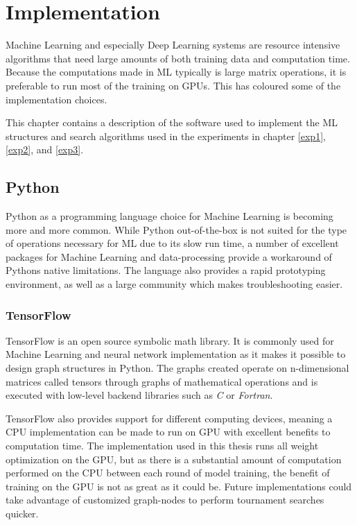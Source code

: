 \chapter{Implementation}
\label{implementation}
Machine Learning and especially Deep Learning systems are resource intensive algorithms that need large amounts of both training data and computation time. Because the computations made in ML typically is large matrix operations, it is preferable to run most of the training on GPUs. This has coloured some of the implementation choices.

This chapter contains a description of the software used to implement the ML structures and search algorithms used in the experiments in chapter \ref{exp1}, \ref{exp2}, and \ref{exp3}.

\section{Python}
Python as a programming language choice for Machine Learning is becoming more and more common. While Python out-of-the-box is not suited for the type of operations necessary for ML due to its slow run time, a number of excellent packages for Machine Learning and data-processing provide a workaround of Pythons native limitations. The language also provides a rapid prototyping environment, as well as a large community which makes troubleshooting easier. 

\subsection{TensorFlow}
TensorFlow\cite{tensorflow} is an open source symbolic math library. It is commonly used for Machine Learning and neural network implementation as it makes it possible to design graph structures in Python. The graphs created operate on n-dimensional matrices called tensors through graphs of mathematical operations and is executed with low-level backend libraries such as \textit{C} or \textit{Fortran}.

TensorFlow also provides support for different computing devices, meaning a CPU implementation can be made to run on GPU with excellent benefits to computation time. The implementation used in this thesis runs all weight optimization on the GPU, but as there is a substantial amount of computation performed on the CPU between each round of model training, the benefit of training on the GPU is not as great as it could be. Future implementations could take advantage of customized graph-nodes to perform tournament searches quicker. 

